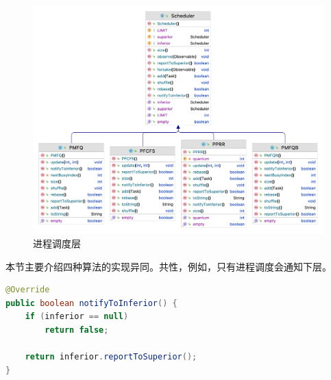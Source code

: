 \documentclass[UTF8]{ctexart}
\begin{document}
\begin{figure}[htbp]
    \centering
    \includegraphics[scale=0.18]{t2-class.png}
    \caption{进程调度层}
\end{figure}

本节主要介绍四种算法的实现异同。共性，例如，只有进程调度会通知下层。
\begin{lstlisting}[language={java},caption={命令下层再次进行调度}]
@Override
public boolean notifyToInferior() {
    if (inferior == null)
        return false;

    return inferior.reportToSuperior();
}
\end{lstlisting}
\end{document}
